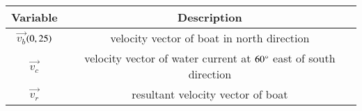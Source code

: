 \begin{tabular}[12pt]{ |c| c| }
    \hline
	\textbf{Variable}  & \textbf{Description}  \\
    \hline
	$\vec{v_b}$$\left(0,25\right)$ & velocity vector of boat in north direction \\
    \hline 
	$\vec{v_c}$ & velocity vector of water current at $60\degree$ east of south direction \\
    \hline
	$\vec{v_r}$& resultant velocity vector of boat  \\  
    \hline         
\end{tabular}
